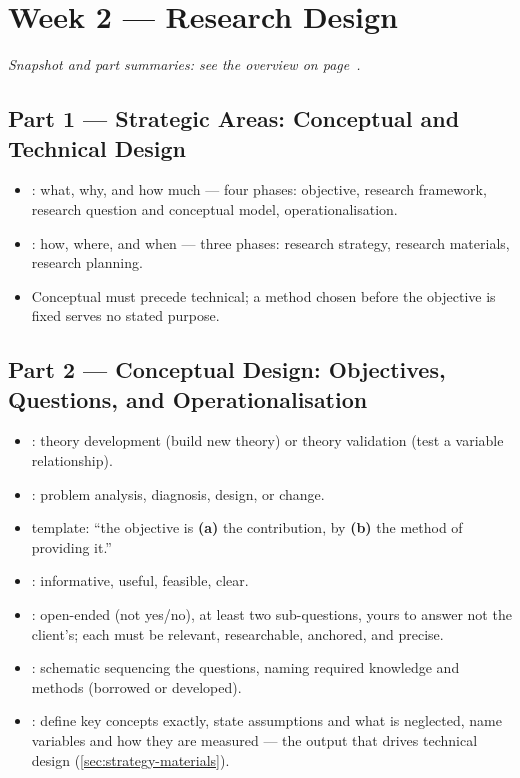 \documentclass[../main.tex]{subfiles}
\begin{document}
\setlength{\parskip}{3pt}

\chapter{Week 2 — Research Design}
\label{ch:week2}

\textit{Snapshot and part summaries: see the overview on page~\pageref{ov:week2}.}

\section{Part 1 — Strategic Areas: Conceptual and Technical Design}
\label{sec:conceptual-technical}

\begin{itemize}
  \item {}: what, why, and how much — four phases: objective, research framework, research question and conceptual model, operationalisation.
  \item {}: how, where, and when — three phases: research strategy, research materials, research planning.
  \item Conceptual must precede technical; a method chosen before the objective is fixed serves no stated purpose.
\end{itemize}

\section{Part 2 — Conceptual Design: Objectives, Questions, and Operationalisation}
\label{sec:objectives-rqs}
\label{sec:operationalization}

\begin{itemize}
  \item {}: theory development (build new theory) or theory validation (test a variable relationship).
  \item {}: problem analysis, diagnosis, design, or change.
  \item {} template: ``the objective is \textbf{(a)} the contribution, by \textbf{(b)} the method of providing it.''
  \item {}: informative, useful, feasible, clear.
  \item {}: open-ended (not yes/no), at least two sub-questions, yours to answer not the client's; each must be relevant, researchable, anchored, and precise.
  \item {}: schematic sequencing the questions, naming required knowledge and methods (borrowed or developed).
  \item {}: define key concepts exactly, state assumptions and what is neglected, name variables and how they are measured — the output that drives technical design (\autoref{sec:strategy-materials}).
\end{itemize}
\end{document}
